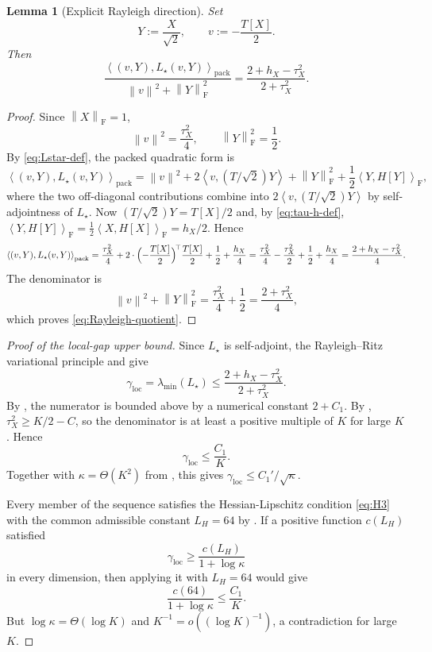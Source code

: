 \documentclass[11pt]{article}
\theoremstyle{plain}
\newtheorem{lemma}[theorem]{Lemma}
\theoremstyle{definition}
\theoremstyle{remark}
\newcommand{\1}{\mathbf{1}}
\newcommand{\norm}[1]{\left\lVert #1\right\rVert}
\newcommand{\inner}[2]{\left\langle #1,#2\right\rangle}
\begin{document}
\begin{lemma}[Explicit Rayleigh direction]
\label{lem:Rayleigh}
Set
\begin{equation}
    Y:=\frac{X}{\sqrt2},
    \qquad
    v:=-\frac{T[X]}{2}.
    \label{eq:Rayleigh-vector}
\end{equation}
Then
\begin{equation}
    \frac{
        \inner{(v,Y)}{L_\star(v,Y)}_{\mathrm{pack}}
    }{
        \norm v^2+\norm Y_{\mathrm F}^2
    }
    =
    \frac{2+h_X-\tau_X^2}{2+\tau_X^2}.
    \label{eq:Rayleigh-quotient}
\end{equation}
\end{lemma}

\begin{proof}
Since $\norm X_{\mathrm F}=1$,
\[
    \norm v^2=\frac{\tau_X^2}{4},
    \qquad
    \norm Y_{\mathrm F}^2=\frac12.
\]
By \eqref{eq:Lstar-def}, the packed quadratic form is
\[
    \inner{(v,Y)}{L_\star(v,Y)}_{\mathrm{pack}}
    =
    \norm v^2
    +
    2\inner{v}{(T/\sqrt2)Y}
    +
    \norm Y_{\mathrm F}^2
    +
    \frac12\inner{Y}{H[Y]}_{\mathrm F},
\]
where the two off-diagonal contributions combine into
$2\inner{v}{(T/\sqrt2)Y}$ by self-adjointness of $L_\star$. Now
$(T/\sqrt2)Y=T[X]/2$ and, by \eqref{eq:tau-h-def},
$\inner{Y}{H[Y]}_{\mathrm F}=\tfrac12\inner{X}{H[X]}_{\mathrm F}=h_X/2$.
Hence
\[
    \inner{(v,Y)}{L_\star(v,Y)}_{\mathrm{pack}}
    =
    \frac{\tau_X^2}{4}
    +
    2\cdot\Bigl(-\frac{T[X]}2\Bigr)^{\!\top}\frac{T[X]}2
    +
    \frac12
    +
    \frac{h_X}{4}
    =
    \frac{\tau_X^2}{4}
    -
    \frac{\tau_X^2}{2}
    +
    \frac12
    +
    \frac{h_X}{4}
    =
    \frac{2+h_X-\tau_X^2}{4}.
\]
The denominator is
\[
    \norm v^2+\norm Y_{\mathrm F}^2
    =
    \frac{\tau_X^2}{4}+\frac12
    =
    \frac{2+\tau_X^2}{4},
\]
which proves \eqref{eq:Rayleigh-quotient}.
\end{proof}

\begin{proof}[Proof of the local-gap upper bound]
Since $L_\star$ is self-adjoint, the Rayleigh--Ritz variational principle and
 give
\[
    \gamma_{\mathrm{loc}}
    =
    \lambda_{\min}(L_\star)
    \leq
    \frac{2+h_X-\tau_X^2}{2+\tau_X^2}.
\]
By , the numerator is bounded above by a numerical constant
$2+C_1$. By , $\tau_X^2\geq K/2-C$, so the denominator is
at least a positive multiple of $K$ for large $K$. Hence
\[
    \gamma_{\mathrm{loc}}
    \leq
    \frac{C_1}{K}.
\]
Together with $\kappa=\Theta(K^2)$ from , this gives
$\gamma_{\mathrm{loc}}\leq C_1'/\sqrt\kappa$.

Every member of the sequence satisfies the Hessian-Lipschitz condition
\eqref{eq:H3} with the common admissible constant $L_H=64$ by
. If a positive function $c(L_H)$ satisfied
\[
    \gamma_{\mathrm{loc}}
    \geq
    \frac{c(L_H)}{1+\log\kappa}
\]
in every dimension, then applying it with $L_H=64$ would give
\[
    \frac{c(64)}{1+\log\kappa}
    \leq
    \frac{C_1}{K}.
\]
But $\log\kappa=\Theta(\log K)$ and
$K^{-1}=o((\log K)^{-1})$, a contradiction for large $K$.
\end{proof}
\end{document}
